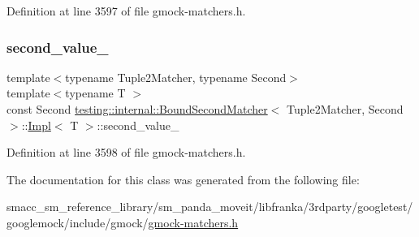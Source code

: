 Definition at line 3597 of file gmock-\/matchers.\+h.

\mbox{\label{classtesting_1_1internal_1_1BoundSecondMatcher_1_1Impl_a240ffac4b65c0fd361d8ff85dca35564}} 
\subsubsection{\texorpdfstring{second\+\_\+value\+\_\+}{second\_value\_}}
{\footnotesize\ttfamily template$<$typename Tuple2\+Matcher, typename Second$>$ \\
template$<$typename T $>$ \\
const Second \hyperlink{classtesting_1_1internal_1_1BoundSecondMatcher}{testing\+::internal\+::\+Bound\+Second\+Matcher}$<$ Tuple2\+Matcher, Second $>$\+::\hyperlink{classtesting_1_1internal_1_1BoundSecondMatcher_1_1Impl}{Impl}$<$ T $>$\+::second\+\_\+value\+\_\+\hspace{0.3cm}{\ttfamily [private]}}



Definition at line 3598 of file gmock-\/matchers.\+h.



The documentation for this class was generated from the following file\+:\begin{DoxyCompactItemize}
\item 
smacc\+\_\+sm\+\_\+reference\+\_\+library/sm\+\_\+panda\+\_\+moveit/libfranka/3rdparty/googletest/googlemock/include/gmock/\hyperlink{gmock-matchers_8h}{gmock-\/matchers.\+h}\end{DoxyCompactItemize}

